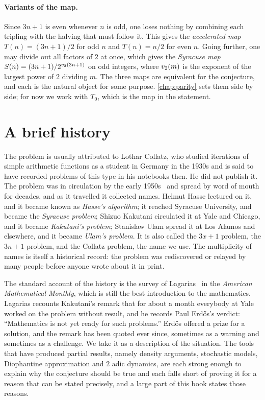 \paragraph{Variants of the map.} Since $3n+1$ is even whenever $n$ is odd, one
loses nothing by combining each tripling with the halving that must follow it.
This gives the \emph{accelerated map} $T(n)=(3n+1)/2$ for odd $n$ and
$T(n)=n/2$ for even $n$. Going further, one may divide out all factors of $2$
at once, which gives the \emph{Syracuse map} $S(n)=(3n+1)/2^{v_2(3n+1)}$ on odd
integers, where $v_2(m)$ is the exponent of the largest power of $2$ dividing
$m$. The three maps are equivalent for the conjecture, and each is the natural
object for some purpose. \cref{chap:parity} sets them side by side; for now we
work with $T_0$, which is the map in the statement.

\section{A brief history}\label{sec:ch1:history}

The problem is usually attributed to Lothar Collatz, who studied iterations of
simple arithmetic functions as a student in Germany in the 1930s and is said
to have recorded problems of this type in his notebooks then. He did not
publish it. The problem was in circulation by the early
1950s~\cite[pp.~3 to 4]{lagarias1985} and spread by word of mouth for
decades, and as it
travelled it collected names. Helmut Hasse lectured on it, and it became known
as \emph{Hasse's algorithm}; it reached Syracuse University, and became the
\emph{Syracuse problem}; Shizuo Kakutani circulated it at Yale and Chicago,
and it became \emph{Kakutani's problem}; Stanislaw Ulam spread it at Los
Alamos and elsewhere, and it became \emph{Ulam's problem}. It is also called
the $3x+1$ problem, the $3n+1$ problem, and the Collatz problem, the name we
use. The multiplicity of names is itself a historical record: the problem was
rediscovered or relayed by many people before anyone wrote about it in print.

The standard account of the history is the survey of
Lagarias~\cite{lagarias1985} in the \emph{American Mathematical Monthly},
which is still the best introduction to the mathematics. Lagarias recounts Kakutani's remark that
for about a month everybody at Yale worked on the problem without result, and
he records Paul Erd\H{o}s's verdict: ``Mathematics is not yet ready for such problems.''
Erd\H{o}s offered a prize for a solution, and the remark
has been quoted ever since, sometimes as a warning and sometimes as a
challenge. We take it as a description of the situation. The tools that have
produced partial results, namely density arguments, stochastic models,
Diophantine approximation and $2$ adic dynamics, are each strong enough to
explain why the conjecture should be true and each falls short of proving it
for a reason that can be stated precisely, and a large part of this book states those reasons.

